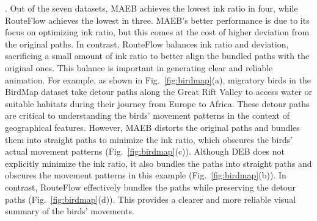 .
Out of the seven datasets, MAEB achieves the lowest ink ratio in four, while RouteFlow achieves the lowest in three.
MAEB's better performance is due to its focus on optimizing ink ratio, but this comes at the cost of higher deviation from the original paths.
In contrast, RouteFlow balances ink ratio and deviation, sacrificing a small amount of ink ratio to better align the bundled paths with the original ones.
This balance is important in generating clear and reliable animation.
For example, as shown in Fig.~\ref{fig:birdmap}(a), migratory birds in the BirdMap dataset take detour paths along the Great Rift Valley to access water or suitable habitats during their journey from Europe to Africa.
These detour paths are critical to understanding the birds' movement patterns in the context of geographical features.
However, MAEB distorts the original paths and bundles them into straight paths to minimize the ink ratio, which obscures the birds' actual movement patterns (Fig.~\ref{fig:birdmap}(c)).
Although DEB does not explicitly minimize the ink ratio, it also bundles the paths into straight paths and obscures the movement patterns in this example (Fig.~\ref{fig:birdmap}(b)).
In contrast, RouteFlow effectively bundles the paths while preserving the detour paths (Fig.~\ref{fig:birdmap}(d)).
This provides a clearer and more reliable visual summary of the birds' movements.